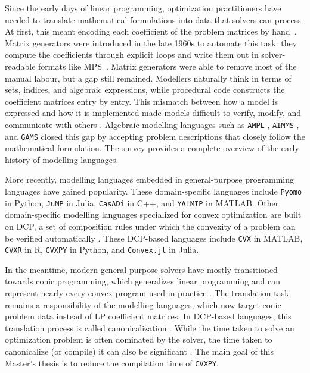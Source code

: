 \label{sec:Introduction}

Since the early days of linear programming, optimization practitioners
have needed to translate mathematical formulations into data that solvers can process.
At first, this meant encoding each coefficient of the problem matrices by
hand~\cite{fourer1978modern}.
Matrix generators were introduced in the late 1960s to automate this task: they compute the
coefficients through explicit loops and write them out in solver-readable formats like
\ac{MPS}~\cite{marceau1971matrix, ibm1976mpsx}.
Matrix generators were able to remove most of the manual labour, but a gap still remained.
Modellers naturally think in terms of sets, indices, and algebraic expressions,
while procedural code constructs the coefficient matrices entry by entry.
This mismatch between how a model is expressed and how it is implemented made models difficult to
verify, modify, and communicate with others \cite{fourer1983modeling}.
Algebraic modelling languages such as \texttt{AMPL} \cite{fourer1990ampl},
\texttt{AIMMS} \cite{bisschop2006aimms}, and \texttt{GAMS} \cite{brooke1988gams} closed this gap by
accepting problem descriptions that closely follow the mathematical formulation.
The survey \cite{orchard-hays1984history} provides a complete overview
of the early history of modelling languages.

More recently, modelling languages embedded in general-purpose programming languages have
gained popularity. These domain-specific languages include \texttt{Pyomo}
\cite{bynum2021pyomo, hart2011pyomo} in Python,
\texttt{JuMP} \cite{dunning2017jump} in Julia, \texttt{CasADi} \cite{andersson2019} in C++, and
\texttt{YALMIP} \cite{lofberg2004yalmip} in MATLAB.
Other domain-specific modelling languages specialized for convex optimization \cite{boyd2004convex}
are built on \ac{DCP}, a set of composition rules under which the
convexity of a problem can be verified automatically
\cite{grant2004disciplined, grant2006disciplined}.
These DCP-based languages include \texttt{CVX} \cite{cvx} in MATLAB, \texttt{CVXR} \cite{Fu_2020} in
R, \texttt{CVXPY} \cite{diamond2016cvxpy} in Python, and \texttt{Convex.jl}
\cite{udell2014convex} in Julia.

In the meantime, modern general-purpose solvers \cite{mosekSolver, ge2022copt, clarabel}
have mostly transitioned towards conic programming, which generalizes linear programming and
can represent nearly every convex program used in practice \cite{bental2001lectures}.
The translation task remains a responsibility of the modelling languages, which now target
conic problem data instead of \ac{LP} coefficient matrices. In DCP-based languages, this
translation process is called canonicalization \cite{agrawal2018rewriting}.
While the time taken to solve an optimization problem is often dominated by the solver, the
time taken to canonicalize (or compile) it can also be significant \cite{agrawal2019dpp}.
The main goal of this Master's thesis is to reduce the compilation time of \texttt{CVXPY}.

